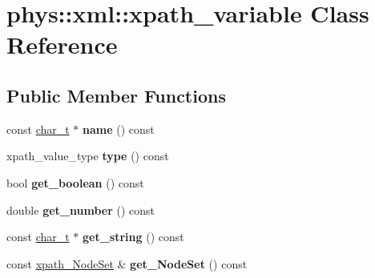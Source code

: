 \hypertarget{classphys_1_1xml_1_1xpath__variable}{
\section{phys::xml::xpath\_\-variable Class Reference}
\label{d8/d2c/classphys_1_1xml_1_1xpath__variable}
}
\subsection*{Public Member Functions}
\begin{DoxyCompactItemize}
\item 
\hypertarget{classphys_1_1xml_1_1xpath__variable_a8846df4f4e19d17625a609802160790f}{
const \hyperlink{namespacephys_1_1xml_afc87705cd1c2917d87b879715a2d8f6e}{char\_\-t} $\ast$ {\bfseries name} () const }
\label{d8/d2c/classphys_1_1xml_1_1xpath__variable_a8846df4f4e19d17625a609802160790f}

\item 
\hypertarget{classphys_1_1xml_1_1xpath__variable_a57edaea36e43573cf0928814fdceddbb}{
xpath\_\-value\_\-type {\bfseries type} () const }
\label{d8/d2c/classphys_1_1xml_1_1xpath__variable_a57edaea36e43573cf0928814fdceddbb}

\item 
\hypertarget{classphys_1_1xml_1_1xpath__variable_ac23a61d47aa2838c776ae876e06a8927}{
bool {\bfseries get\_\-boolean} () const }
\label{d8/d2c/classphys_1_1xml_1_1xpath__variable_ac23a61d47aa2838c776ae876e06a8927}

\item 
\hypertarget{classphys_1_1xml_1_1xpath__variable_a0972c04d65184f5ffbadc2a187313f1a}{
double {\bfseries get\_\-number} () const }
\label{d8/d2c/classphys_1_1xml_1_1xpath__variable_a0972c04d65184f5ffbadc2a187313f1a}

\item 
\hypertarget{classphys_1_1xml_1_1xpath__variable_ab0315cab85c5ed64aaf2b74b2e13e58c}{
const \hyperlink{namespacephys_1_1xml_afc87705cd1c2917d87b879715a2d8f6e}{char\_\-t} $\ast$ {\bfseries get\_\-string} () const }
\label{d8/d2c/classphys_1_1xml_1_1xpath__variable_ab0315cab85c5ed64aaf2b74b2e13e58c}

\item 
\hypertarget{classphys_1_1xml_1_1xpath__variable_ad8b2518a45a8f3ac6f175b393a9e5d69}{
const \hyperlink{classphys_1_1xml_1_1xpath__NodeSet}{xpath\_\-NodeSet} \& {\bfseries get\_\-NodeSet} () const }
\label{d8/d2c/classphys_1_1xml_1_1xpath__variable_ad8b2518a45a8f3ac6f175b393a9e5d69}


\end{DoxyCompactItemize}
